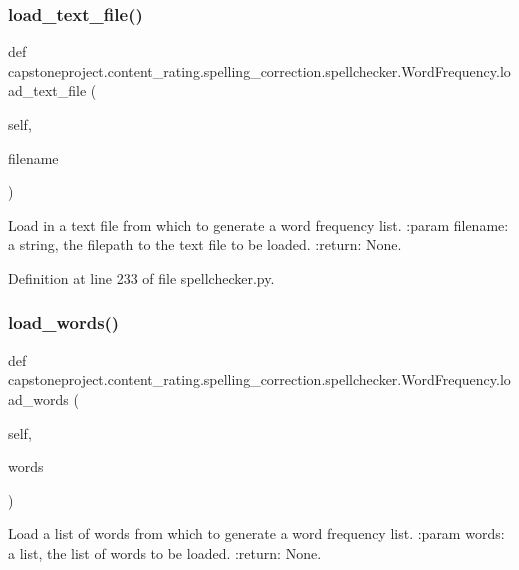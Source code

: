 \subsubsection{\texorpdfstring{load\+\_\+text\+\_\+file()}{load\_text\_file()}}
{\footnotesize\ttfamily def capstoneproject.\+content\+\_\+rating.\+spelling\+\_\+correction.\+spellchecker.\+Word\+Frequency.\+load\+\_\+text\+\_\+file (\begin{DoxyParamCaption}\item[{}]{self,  }\item[{}]{filename }\end{DoxyParamCaption})}

\begin{DoxyVerb}Load in a text file from which to generate a word frequency list.
:param filename: a string, the filepath to the text file to be loaded.
:return: None.
\end{DoxyVerb}
 

Definition at line 233 of file spellchecker.\+py.

\mbox{\label{classcapstoneproject_1_1content__rating_1_1spelling__correction_1_1spellchecker_1_1_word_frequency_a2a34cf90e967f95368434ce1328cb41a}} 
\subsubsection{\texorpdfstring{load\+\_\+words()}{load\_words()}}
{\footnotesize\ttfamily def capstoneproject.\+content\+\_\+rating.\+spelling\+\_\+correction.\+spellchecker.\+Word\+Frequency.\+load\+\_\+words (\begin{DoxyParamCaption}\item[{}]{self,  }\item[{}]{words }\end{DoxyParamCaption})}

\begin{DoxyVerb}Load a list of words from which to generate a word frequency list.
:param words: a list, the list of words to be loaded.
:return: None.
\end{DoxyVerb}
 

